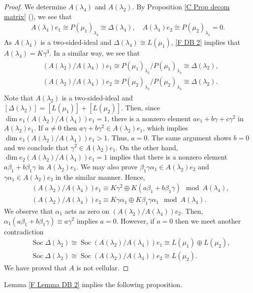 \documentclass[12pt]{amsart}
\numberwithin{equation}{thm}
\renewcommand\a{\alpha}  %
\renewcommand\b{\beta}   %
\newcommand\g{\gamma}
\newcommand\la{\lambda}
\newcommand\D{\Delta}
\newcommand\Soc{\operatorname{Soc}}
\newcounter{ni}
\newcommand{\roii}{\roman{ni}}
\begin{document}
\begin{proof}
We determine $A(\la_4)$ and $A(\la_2)$. By Proposition \ref{C Prop decom matrix} (\roii), 
we see that 
\begin{align}
\label{F DB 2}
A(\la_4) e_1 \cong P(\mu_1)_{\la_4} \cong \D(\la_4), 
\quad 
A(\la_4) e_2 \cong P(\mu_2)_{\la_4} =0. 
\end{align}
As $A (\la_4)$ is a two-sided-ideal and $\D(\la_4) \cong L(\mu_1)$, 
\eqref{F DB 2} implies that $A(\la_4) = K \g^3$. 
In a similar way, we see that 
\begin{align}
\label{F DB 2-2}
\begin{split}
&(A(\la_2)/ A(\la_4) )e_1 \cong P(\mu_1)_{\la_2} / P(\mu_1)_{\la_4} \cong \D(\la_2), 
\\
&(A(\la_2) / A(\la_4)) e_2 \cong P(\mu_2)_{\la_2} / P(\mu_2)_{\la_4} \cong \D(\la_2). 
\end{split}
\end{align}
Note that $A (\la_2)$ is a two-sided-ideal and $[ \D(\la_2) ] = [L(\mu_1)] + [L(\mu_2)]$.  
Then, since $\dim e_1(A(\la_2)/ A(\la_4) )e_1 = 1$, there is a nonzero element $ae_1+b\g+c\g^2$ in $A(\la_2)e_1$. If $a\ne0$ 
then $a\g+b\g^2 \in A(\la_2)e_1$, which implies $\dim e_1(A(\la_2)/ A(\la_4) )e_1>1$. 
Thus, $a=0$. The same argument shows $b=0$ and we conclude that $\g^2\in A(\la_2)e_1$. On the other hand, $\dim e_2(A(\la_2)/ A(\la_4) )e_1 = 1$
implies that there is a nonzero element $a\b_1+b\b_1\g$ in $A(\la_2)e_1$. 
We may also prove $\beta_1\gamma\alpha_1 \in A(\la_2)e_2$ and $\gamma\alpha_1 \in A(\la_2)e_2$ in the similar manner. Hence,
\begin{align*}
&(A(\la_2)/ A(\la_4)) e_1 \equiv K \g^2 \oplus K (a\b_1 + b\b_1\g) \mod A (\la_4), 
\\ 
&(A(\la_2)/ A(\la_4))e_2 \equiv K \g \a_1 \oplus K \b_1 \g \a_1 \mod A (\la_4).
\end{align*}
We observe that $\a_1$ acts as zero on $(A(\la_2)/ A(\la_4))e_2$. Then, $\a_1(a\b_1 + b\b_1\g) \equiv a\g^2$ implies $a=0$. 
However, if $a=0$ then we meet another contradiction
\begin{align*}
&\Soc \D(\la_2) \cong \Soc (A(\la_2)/ A(\la_4)) e_1 \cong L(\mu_1) \oplus L(\mu_2), 
\\ 
&\Soc \D(\la_2) \cong  \Soc (A(\la_2)/ A(\la_4))e_2 \cong  L(\mu_2).
\end{align*}
We have proved that $A$ is not cellular. 
\end{proof}


Lemma \ref{F Lemma DB 2} implies the following proposition. 
\end{document}
